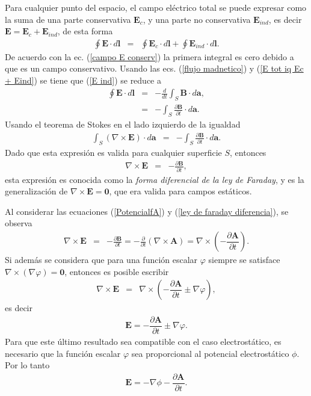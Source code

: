 Para cualquier punto del espacio, el campo eléctrico total se puede expresar como la suma de una parte conservativa $\textbf{E}_c$, y una parte no conservativa $\textbf{E}_{ind}$, es decir $\textbf{E}=\textbf{E}_c+\textbf{E}_{ind}$, de esta forma
\begin{eqnarray}
\oint\textbf{E}\cdot d\textbf{l}&=&\oint\textbf{E}_{c}\cdot d\textbf{l}+\oint\textbf{E}_{ind}\cdot d\textbf{l}.\label{E tot iq Ec + Eind}
\end{eqnarray}
De acuerdo con la ec. (\ref{campo E conserv}) la primera integral es cero debido a que es un campo conservativo. Usando las ecs. (\ref{flujo madnetico}) y (\ref{E tot iq Ec + Eind}) se tiene que (\ref{E ind}) se reduce a
\begin{eqnarray}
\oint\textbf{E}\cdot d\textbf{l}&=&-\frac{d}{dt}\int_S\textbf{B}\cdot d\textbf{a},\nonumber\\
&=&-\int_S\frac{\partial\textbf{B}}{\partial t}\cdot d\textbf{a}.\label{e to iq m part B}
\end{eqnarray}
Usando el teorema de Stokes en el lado izquierdo de la igualdad
\begin{eqnarray}
\int_S(\nabla\times\textbf{E})\cdot d\textbf{a}&=&-\int_S\frac{\partial\textbf{B}}{\partial t}\cdot d\textbf{a}.
\end{eqnarray}
Dado que esta expresión es valida para cualquier superficie $S$, entonces
\begin{eqnarray}
\nabla\times\textbf{E}&=&-\frac{\partial\textbf{B}}{\partial t},\label{ley de faraday diferencia}
\end{eqnarray}
esta expresión es conocida como la \emph{forma diferencial de la ley de Faraday}, y es la generalización de $\nabla\times \textbf{E}=\textbf{0}$, que era valida para campos estáticos.
\begin{obs}
Al considerar las ecuaciones  (\ref{PotencialfA}) y  (\ref{ley de faraday diferencia}), se observa
\begin{eqnarray}
\nabla\times\textbf{E}&=&-\frac{\partial\textbf{B}}{\partial t}=-\frac{\partial}{\partial t}(\nabla\times\textbf{A})=\nabla\times\left(-\dfrac{\partial \textbf{A}}{\partial t}\right).
\end{eqnarray}
Si además se considera que para una función escalar $\varphi$ siempre se satisface $\nabla\times (\nabla\varphi)=\mathbf{0}$, entonces
es posible escribir
\begin{eqnarray}
\nabla\times\textbf{E}&=&\nabla\times\left(-\dfrac{\partial \textbf{A}}{\partial t}\pm\nabla\varphi\right),
\end{eqnarray}
es decir
\begin{eqnarray*}
\textbf{E}=-\dfrac{\partial \textbf{A}}{\partial t}\pm\nabla\varphi.
\end{eqnarray*}
Para que este último resultado sea compatible con el caso electrostático, es necesario que la función escalar $\varphi$ sea proporcional al potencial electrostático $\phi$. Por lo tanto
\begin{eqnarray}
\textbf{E}=-\nabla\phi-\dfrac{\partial \textbf{A}}{\partial t}.\label{EPhiA}
\end{eqnarray}
\end{obs}




